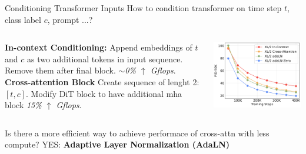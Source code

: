 \documentclass{beamer}
\begin{document}
\begin{frame}[t]{Conditioning Transformer Inputs}
    \vspace{-1.1em}
    How to condition transformer on time step $t$, class label $c$, prompt ...? \newline
	\begin{columns}[t]
		\begin{column}{.5\textwidth}
            \textbf{In-context Conditioning:}\newline
            Append embeddings of $t$ and $c$ as two additional tokens in input sequence.
            Remove them after final block.
            \textit{$\sim$0\% $\uparrow$ Gflops}.
            \newline
            \textbf{Cross-attention Block}\newline
            Create sequence of lenght 2: $[t,c]$. 
            Modify DiT block to have additional mha block
            \textit{15\% $\uparrow$ Gflops}.
		\end{column}
		\begin{column}{.5\textwidth}
            \begin{center}
                \includegraphics[width=1.0\textwidth]{./img/diff_arch_norm.png}
            \end{center}
		\end{column}
	\end{columns}
    Is there a more efficient way to achieve performace of cross-attn with less compute? \newline
    YES: \textbf{Adaptive Layer Normalization (AdaLN)} \newline
\end{frame}
\end{document}
